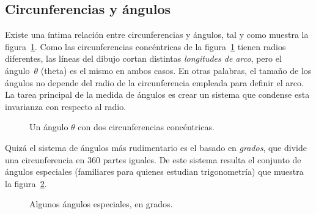   \subsection{Circunferencias y ángulos} %
  \label{sec:circles_and_angles}

Existe una íntima relación entre circunferencias y ángulos, tal y como muestra la figura~\ref{fig:angle_arclength}. Como las circunferencias concéntricas de la figura~\ref{fig:angle_arclength} tienen radios diferentes, las líneas del dibujo cortan distintas \emph{longitudes de arco}, pero el ángulo~$\theta$ (theta) es el mismo en ambos casos. En otras palabras, el tamaño de los ángulos no depende del radio de la circunferencia empleada para definir el arco. La tarea principal de la medida de ángulos es crear un sistema que condense esta invarianza con respecto al radio.

\begin{figure}
\begin{center}
\end{center}
\caption{Un ángulo $\theta$ con dos circunferencias concéntricas.\label{fig:angle_arclength}}
\end{figure}

Quizá el sistema de ángulos más rudimentario es el basado en \emph{grados}, que divide una circunferencia en 360 partes iguales. De este sistema resulta el conjunto de ángulos especiales (familiares para quienes estudian trigonometría) que muestra la figura~\ref{fig:degree_angles}.

\begin{figure}
\begin{center}
\end{center}
\caption{Algunos ángulos especiales, en grados.\label{fig:degree_angles}}
\end{figure}

